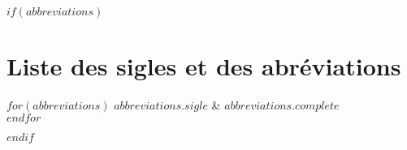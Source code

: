 \documentclass[11pt,twoside,maitrise]{littfra}
\numberwithin{equation}{section}
\numberwithin{table}{chapter}
\numberwithin{figure}{chapter}
\begin{document}

\francais
\cleardoublepage
{}  %
\tableofcontents
\cleardoublepage
{}  %


$if(abbreviations)$

\chapter*{Liste des sigles et des abréviations}
\begin{twocolumnlist}{.2\textwidth}{.7\textwidth}
  $for(abbreviations)$
  $abbreviations.sigle$ & $abbreviations.complete$\\
  $endfor$
\end{twocolumnlist}
$endif$
\end{document}
